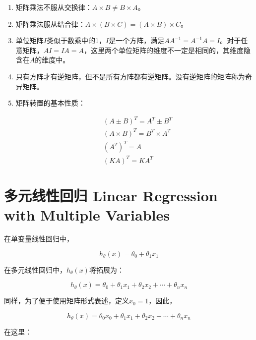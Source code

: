 \documentclass[12pt, a4paper]{article}
\begin{document}
\begin{enumerate}
    \item 
          矩阵乘法不服从交换律：$A\times B\neq B\times A$。
    \item 
          矩阵乘法服从结合律：$A\times(B\times C) = (A\times B)\times C$。
    \item 
          单位矩阵$I$类似于数乘中的1，$I$是一个方阵，满足$AA^{-1}=A^{-1}A=I$。对于任意矩阵，$AI=IA=A$，这里两个单位矩阵的维度不一定是相同的，其维度隐含在$A$的维度中。
    \item 
          只有方阵才有逆矩阵，但不是所有方阵都有逆矩阵。没有逆矩阵的矩阵称为奇异矩阵。
    \item 
          矩阵转置的基本性质：
          
          \begin{align*}
               & (A\pm B)^T = A^T\pm B^T       \\
               & (A\times B)^T = B^T\times A^T \\
               & (A^T)^T = A                   \\
               & (KA)^T = KA^T
          \end{align*}
\end{enumerate}

\section{多元线性回归 Linear Regression with Multiple Variables}

在单变量线性回归中，

\begin{equation*}
    h_\theta(x) = \theta_0 + \theta_1x_1
\end{equation*}

在多元线性回归中，$h_\theta(x)$将拓展为：

\begin{equation*}
    h_\theta(x)=\theta_0 + \theta_1x_1+ \theta_2x_2+\cdots+\theta_nx_n
\end{equation*}

同样，为了便于使用矩阵形式表述，定义$x_0=1$，因此，

\begin{equation*}
    h_\theta(x)=\theta_0x_0 + \theta_1x_1+ \theta_2x_2+\cdots+\theta_nx_n
\end{equation*}

在这里：
\end{document}
